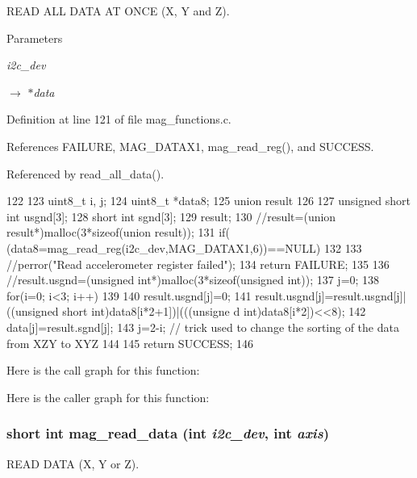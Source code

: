 READ ALL DATA AT ONCE (X, Y and Z). 


\begin{DoxyParams}{Parameters}
\item[{\em i2c\_\-dev}]\item[\mbox{$\rightarrow$} {\em $\ast$data}]\end{DoxyParams}


Definition at line 121 of file mag\_\-functions.c.



References FAILURE, MAG\_\-DATAX1, mag\_\-read\_\-reg(), and SUCCESS.



Referenced by read\_\-all\_\-data().




\begin{DoxyCode}
122 {
123   uint8_t i, j;
124   uint8_t *data8;
125   union result
126   {
127     unsigned short int usgnd[3];
128     short int sgnd[3];
129   } result;
130   //result=(union result*)malloc(3*sizeof(union result));
131   if( (data8=mag_read_reg(i2c_dev,MAG_DATAX1,6))==NULL)
132   {
133     //perror("Read accelerometer register failed");
134     return FAILURE;
135   }
136   //result.usgnd=(unsigned int*)malloc(3*sizeof(unsigned int));
137   j=0;
138   for(i=0; i<3; i++)
139   {
140     result.usgnd[j]=0;
141     result.usgnd[j]=result.usgnd[j]|((unsigned short int)data8[i*2+1])|(((unsigne
      d int)data8[i*2])<<8);
142     data[j]=result.sgnd[j];
143     j=2-i; // trick used to change the sorting of the data from XZY to XYZ
144   }
145   return SUCCESS;  
146 }
\end{DoxyCode}




Here is the call graph for this function:



Here is the caller graph for this function:

\hypertarget{group__mag_ga542a31ccd07cd2c3e8e2b68cdb6d219e}{
\subsubsection[{mag\_\-read\_\-data}]{\setlength{\rightskip}{0pt plus 5cm}short int mag\_\-read\_\-data (int {\em i2c\_\-dev}, \/  int {\em axis})}}
\label{group__mag_ga542a31ccd07cd2c3e8e2b68cdb6d219e}


READ DATA (X, Y or Z). 


